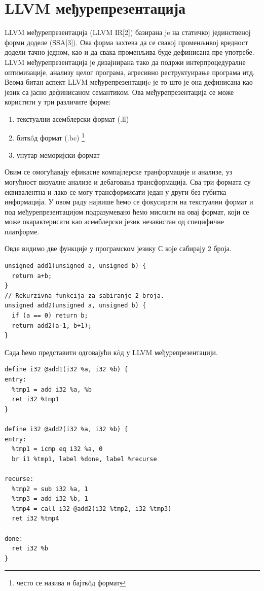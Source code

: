 \documentclass[12pt,oneside]{memoir}
\begin{document}
\section{LLVM међурепрезентација}
LLVM међурепрезентација (LLVM IR[2]) базирана je на статичкој 
јединственој форми доделе (SSA[3]).
Ова форма захтева да се свакој променљивој вредност додели тачно једном, као и да
свака променљива буде дефинисана пре употребе.
LLVM међурепрезентација је дизајнирана тако да подржи интерпроцедуралне оптимизације,
анализу целог програма, агресивно реструктуирање програма итд.
Веома битан аспект LLVM међурепрезентацијe је то што је она дефинисана као 
језик са јасно дефинисаном семантиком.
Ова међурепрезентација се може користити у три различите форме: 
\begin{enumerate}
\item текстуални асемблерски формат (.ll)
\item битк\^{o}д  формат (.bc) \footnote{често се назива и бајтк\^{o}д формат}
\item унутар-меморијски формат 
\end{enumerate} 
Овим се омогућавају ефикасне компајлерске транформације и анализе, уз могућност
визуалне анализе и дебаговања трансформација. 
Сва три формата су еквивалентна и лако се могу трансформисати један у други без
губитка информација. 
У овом раду највише ћемо се фокусирати на текстуални формат и под међурепрезентацијом
подразумевано ћемо мислити на овај формат, који се може окарактерисати као асемблерски 
језик независтан од специфичне платформе.

Овде видимо две функције у програмском језику С које сабирају 2 броја.
\begin{lstlisting}
unsigned add1(unsigned a, unsigned b) {
  return a+b;
}
// Rekurzivna funkcija za sabiranje 2 broja.
unsigned add2(unsigned a, unsigned b) {
  if (a == 0) return b;
  return add2(a-1, b+1);
}
\end{lstlisting}

Сада ћемо представити одговајући к\^{o}д у LLVM међурепрезентацији.
\begin{lstlisting}
define i32 @add1(i32 %a, i32 %b) {
entry:
  %tmp1 = add i32 %a, %b
  ret i32 %tmp1
}

define i32 @add2(i32 %a, i32 %b) {
entry:
  %tmp1 = icmp eq i32 %a, 0
  br i1 %tmp1, label %done, label %recurse

recurse:
  %tmp2 = sub i32 %a, 1
  %tmp3 = add i32 %b, 1
  %tmp4 = call i32 @add2(i32 %tmp2, i32 %tmp3)
  ret i32 %tmp4

done:
  ret i32 %b
}
\end{lstlisting}
\end{document}
